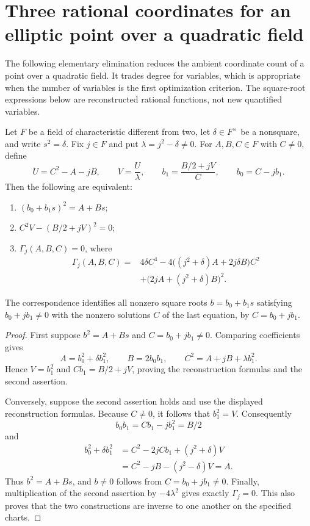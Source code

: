 
\section{Three rational coordinates for an elliptic point over a quadratic field}
\label{sec:quadratic-point-compression}

The following elementary elimination reduces the ambient coordinate count
of a point over a quadratic field.  It trades degree for variables, which
is appropriate when the number of variables is the first optimization
criterion.  The square-root expressions below are reconstructed rational
functions, not new quantified variables.

\begin{proposition}
\label{prop:quadratic-square-root}
Let $F$ be a field of characteristic different from two, let
$\delta\in F^\times$ be a nonsquare, and write $s^2=\delta$.
Fix $j\in F$ and put $\lambda=j^2-\delta\ne0$.
For $A,B,C\in F$ with $C\ne0$, define
\[
 U=C^2-A-jB,\qquad V=\frac{U}{\lambda},\qquad
 b_1=\frac{B/2+jV}{C},\qquad b_0=C-jb_1.
\]
Then the following are equivalent:
\begin{enumerate}
 \item $(b_0+b_1s)^2=A+Bs$;
 \item $C^2V-(B/2+jV)^2=0$;
 \item $\Gamma_j(A,B,C)=0$, where
 \begin{align*}
 \Gamma_j(A,B,C)
 ={}&4\delta C^4
   -4\bigl((j^2+\delta)A+2j\delta B\bigr)C^2\\
   &+\bigl(2jA+(j^2+\delta)B\bigr)^2.
 \end{align*}
\end{enumerate}
The correspondence identifies all nonzero square roots
$b=b_0+b_1s$ satisfying $b_0+jb_1\ne0$ with the nonzero solutions
$C$ of the last equation, by $C=b_0+jb_1$.
\end{proposition}
\begin{proof}
First suppose $b^2=A+Bs$ and $C=b_0+jb_1\ne0$.
Comparing coefficients gives
\[
 A=b_0^2+\delta b_1^2,\qquad B=2b_0b_1,
 \qquad C^2=A+jB+\lambda b_1^2.
\]
Hence $V=b_1^2$ and $Cb_1=B/2+jV$, proving the reconstruction formulas
and the second assertion.

Conversely, suppose the second assertion holds and use the displayed
reconstruction formulas.  Because $C\ne0$, it follows that $b_1^2=V$.
Consequently
\[
 b_0b_1=Cb_1-jb_1^2=B/2
\]
and
\begin{align*}
 b_0^2+\delta b_1^2
 &=C^2-2jCb_1+(j^2+\delta)V\\
 &=C^2-jB-(j^2-\delta)V=A.
\end{align*}
Thus $b^2=A+Bs$, and $b\ne0$ follows from $C=b_0+jb_1\ne0$.
Finally, multiplication of the second assertion by $-4\lambda^2$
gives exactly $\Gamma_j=0$.  This also proves that the two
constructions are inverse to one another on the specified charts.
\end{proof}

